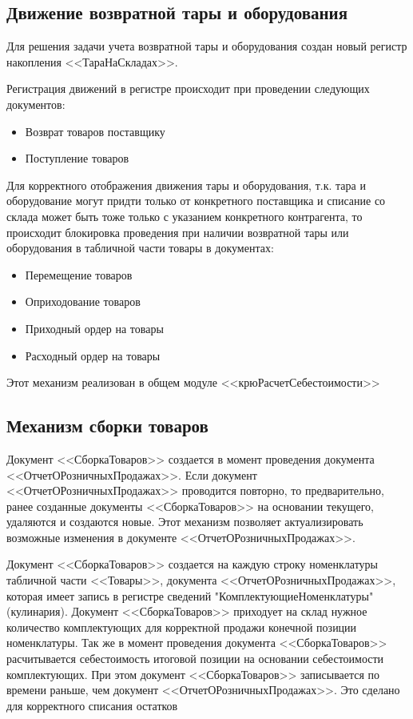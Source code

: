 \subsection{Движение возвратной тары и оборудования}\label{1003}	 

Для решения задачи учета возвратной тары и оборудования создан новый регистр накопления <<ТараНаСкладах>>. 

Регистрация движений в регистре происходит при проведении следующих документов:  
\begin{itemize}
	\item Возврат товаров поставщику
	\item Поступление товаров
\end{itemize}

Для корректного отображения движения тары и оборудования, т.к. тара и оборудование могут придти только от конкретного поставщика и списание со склада может быть тоже только с указанием конкретного контрагента, то происходит блокировка проведения при наличии возвратной тары или оборудования в табличной части товары в  документах:

\begin{itemize}
	\item Перемещение товаров
	\item Оприходование товаров
	\item Приходный ордер на товары
	\item Расходный ордер на товары
\end{itemize}

Этот механизм реализован в общем модуле <<крюРасчетСебестоимости>>
	 

\subsection{Механизм сборки товаров}\label{1004}	 

Документ <<СборкаТоваров>> создается в момент проведения документа <<ОтчетОРозничныхПродажах>>.
Если документ <<ОтчетОРозничныхПродажах>> проводится повторно, то предварительно, ранее созданные документы <<СборкаТоваров>> на основании текущего, удаляются и создаются новые. Этот механизм позволяет актуализировать возможные изменения в документе <<ОтчетОРозничныхПродажах>>.

Документ <<СборкаТоваров>> создается на каждую строку номенклатуры табличной части <<Товары>>, документа  <<ОтчетОРозничныхПродажах>>, которая имеет запись в регистре сведений "КомплектующиеНоменклатуры" (кулинария).
Документ <<СборкаТоваров>> приходует на склад нужное количество комплектующих для корректной продажи конечной позиции номенклатуры. Так же в момент проведения документа <<СборкаТоваров>> расчитывается себестоимость итоговой позиции на основании себестоимости комплектующих.
При этом документ <<СборкаТоваров>> записывается по времени раньше, чем документ <<ОтчетОРозничныхПродажах>>. Это сделано для корректного списания остатков

